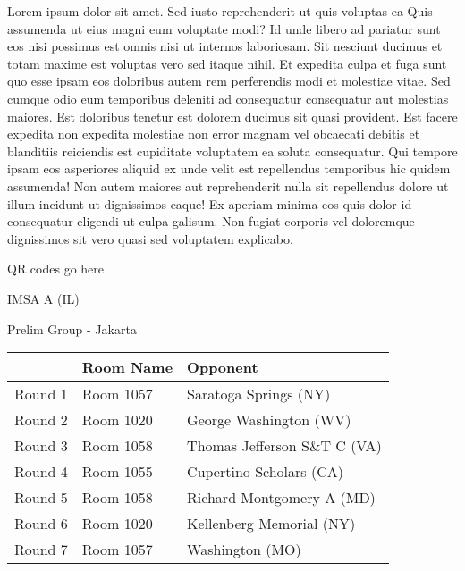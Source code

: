 \documentclass{article}%
\begin{document}
\vspace*{8pt}%
\linebreak%
\newline%
\newline%
Lorem ipsum dolor sit amet. Sed iusto reprehenderit ut quis voluptas ea Quis assumenda ut eius magni eum voluptate modi? Id unde libero ad pariatur sunt eos nisi possimus est omnis nisi ut internos laboriosam. Sit nesciunt ducimus et totam maxime est voluptas vero sed itaque nihil. Et expedita culpa et fuga sunt quo esse ipsam eos doloribus autem rem perferendis modi et molestiae vitae.\newline%
\newline%
Sed cumque odio eum temporibus deleniti ad consequatur consequatur aut molestias maiores. Est doloribus tenetur est dolorem ducimus sit quasi provident. Est facere expedita non expedita molestiae non error magnam vel obcaecati debitis et blanditiis reiciendis est cupiditate voluptatem ea soluta consequatur. Qui tempore ipsam eos asperiores aliquid ex unde velit est repellendus temporibus hic quidem assumenda!\newline%
\newline%
Non autem maiores aut reprehenderit nulla sit repellendus dolore ut illum incidunt ut dignissimos eaque! Ex aperiam minima eos quis dolor id consequatur eligendi ut culpa galisum. Non fugiat corporis vel doloremque dignissimos sit vero quasi sed voluptatem explicabo.\newline%
\newline%
%
\vspace*{30pt}%
\begin{center}%
\begin{Huge}%
QR codes go here%
\end{Huge}%
\end{center}%
\newpage%
%
\begin{center}%
\begin{Huge}%
IMSA A (IL)%
\end{Huge}%
\vspace*{8pt}%
\linebreak%
\begin{Large}%
Prelim Group {-} Jakarta%
\end{Large}%
\end{center}%
\begin{tabularx}{\textwidth}{|c|Y|Y|}%
\hline%
&Room Name&Opponent\\%
\hline%
Round 1&Room 1057&Saratoga Springs (NY)\\%
Round 2&Room 1020&George Washington (WV)\\%
Round 3&Room 1058&Thomas Jefferson S\&T C (VA)\\%
Round 4&Room 1055&Cupertino Scholars (CA)\\%
Round 5&Room 1058&Richard Montgomery A (MD)\\%
Round 6&Room 1020&Kellenberg Memorial (NY)\\%
Round 7&Room 1057&Washington (MO)\\%
\hline%
\end{tabularx}%
\end{document}
